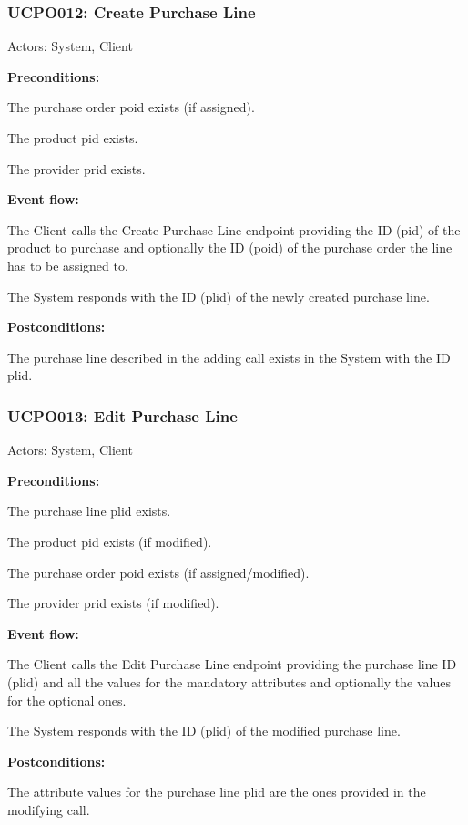 \begin{ucbox}{\subsubsection{UCPO012: Create Purchase Line}}
\label{UCPO012}

Actors: System, Client

\textbf{Preconditions:}

\ucitem The purchase order poid exists (if assigned).

\ucitem The product pid exists.

\ucitem The provider prid exists.

\textbf{Event flow:}

\ucitem The Client calls the Create Purchase Line endpoint providing the ID (pid) of the product to purchase and optionally the ID (poid) of the purchase order the line has to be 
assigned to.

\ucitem The System responds with the ID (plid) of the newly created purchase line.

\textbf{Postconditions:}

\ucitem The purchase line described in the adding call exists in the System with the ID plid.

\end{ucbox}

\begin{ucbox}{\subsubsection{UCPO013: Edit Purchase Line}}
\label{UCPO013}

Actors: System, Client

\textbf{Preconditions:}

\ucitem The purchase line plid exists.

\ucitem The product pid exists (if modified).

\ucitem The purchase order poid exists (if assigned/modified).

\ucitem The provider prid exists (if modified).

\textbf{Event flow:}

\ucitem The Client calls the Edit Purchase Line endpoint providing the purchase line ID (plid) and all the values for the mandatory attributes and optionally the values for the 
optional ones.

\ucitem The System responds with the ID (plid) of the modified purchase line.

\textbf{Postconditions:}

\ucitem The attribute values for the purchase line plid are the ones provided in the modifying call.

\end{ucbox}


